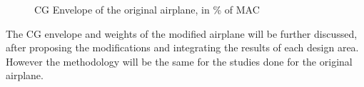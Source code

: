 \begin{figure}[H] %
\caption{CG Envelope of the original airplane, in \% of MAC}
\label{fig:envelopeCGoriginal}
\end{figure}

The CG envelope and weights of the modified airplane will be further discussed, after proposing the modifications and integrating the results of each design area. However the methodology will be the same for the studies done for the original airplane.

